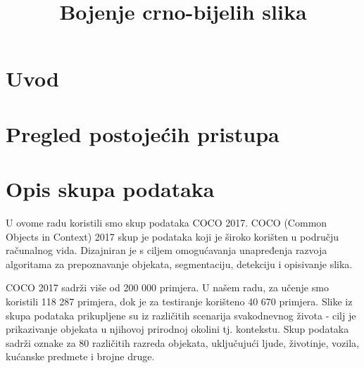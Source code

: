 \documentclass[conference]{IEEEtran}
\begin{document}
\title{Bojenje crno-bijelih slika}


\author{
		\and
		\and
		\and
		\and
		\and
		}
	

\maketitle



\section{Uvod}


\section{Pregled postojećih pristupa}


\section{Opis skupa podataka}

U ovome radu koristili smo skup podataka COCO 2017.
COCO (Common Objects in Context) 2017 skup je podataka koji je široko korišten u području računalnog vida. Dizajniran je s ciljem omogućavanja unapređenja razvoja algoritama za prepoznavanje objekata, segmentaciju, detekciju i opisivanje slika.

COCO 2017 sadrži više od 200 000 primjera. U našem radu, za učenje smo koristili 118 287 primjera, dok je za testiranje korišteno 40 670 primjera.
Slike iz skupa podataka prikupljene su iz različitih scenarija svakodnevnog života - cilj je prikazivanje objekata u njihovoj prirodnoj okolini tj. kontekstu.
Skup podataka sadrži oznake za 80 različitih razreda objekata, uključujući ljude, životinje, vozila, kućanske predmete i brojne druge.
\end{document}
